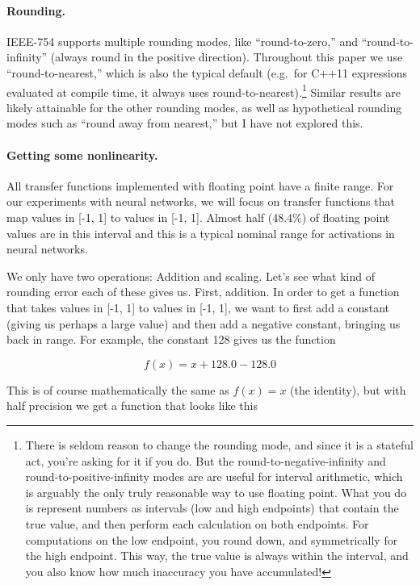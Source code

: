 \documentclass[twocolumn]{article}
\begin{document}
\paragraph{Rounding.}
IEEE-754 supports multiple rounding modes, like ``round-to-zero,'' and
``round-to-infinity'' (always round in the positive direction).
Throughout this paper we use ``round-to-nearest,'' which is also the
typical default (e.g.~for C++11 expressions evaluated at compile time,
it always uses round-to-nearest).\footnote{There is seldom reason to
  change the rounding mode, and since it is a stateful act, you're
  asking for it if you do. But the round-to-negative-infinity and
  round-to-positive-infinity modes are are useful for interval
  arithmetic, which is arguably the only truly reasonable way to use
  floating point. What you do is represent numbers as intervals (low
  and high endpoints) that contain the true value, and then perform
  each calculation on both endpoints. For computations on the low
  endpoint, you round down, and symmetrically for the high endpoint.
  This way, the true value is always within the interval, and you also
  know how much inaccuracy you have accumulated!} Similar results are
likely attainable for the other rounding modes, as well as
hypothetical rounding modes such as ``round away from nearest,'' but I
have not explored this.

\paragraph{Getting some nonlinearity.} \label{sec:plus128}
All transfer functions implemented with floating point have a finite
range. For our experiments with neural networks, we will focus on
transfer functions that map values in [-1, 1] to values in [-1, 1].
Almost half (48.4\%) of floating point values are in this interval and this
is a typical nominal range for activations in neural networks.

We only have two operations: Addition and scaling. Let's see what kind
of rounding error each of these gives us. First, addition. In order to
get a function that takes values in [-1, 1] to values in [-1, 1], we
want to first add a constant (giving us perhaps a large value) and
then add a negative constant, bringing us back in range. For example,
the constant 128 gives us the function

$$f(x) = x + 128.0 - 128.0$$

This is of course mathematically the same as $f(x) = x$ (the
identity), but with half precision we get a function that looks like
this
\end{document}
